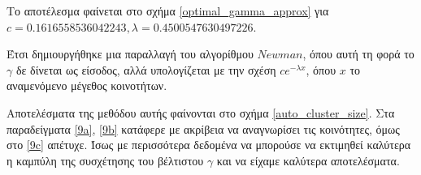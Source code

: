 \documentclass[12pt, letterpaper]{article}
\begin{document}
Το αποτέλεσμα φαίνεται στο σχήμα \ref{optimal_gamma_approx} για $c = 0.1616558536042243, \lambda = 0.4500547630497226$.

Έτσι δημιουργήθηκε μια παραλλαγή του αλγορίθμου $Newman$, όπου αυτή τη φορά 
το $\gamma$ δε δίνεται ως είσοδος, αλλά υπολογίζεται με την σχέση $ce^{-\lambda x}$,
όπου $x$ το αναμενόμενο μέγεθος κοινοτήτων.

Αποτελέσματα της μεθόδου αυτής φαίνονται στο σχήμα \ref{auto_cluster_size}.
Στα παραδείγματα \ref{9a}, \ref{9b} κατάφερε με ακρίβεια να αναγνωρίσει 
τις κοινότητες, όμως στο \ref{9c} απέτυχε. Ίσως με περισσότερα δεδομένα 
να μπορούσε να εκτιμηθεί καλύτερα η καμπύλη της συσχέτησης του βέλτιστου $\gamma$
και να είχαμε καλύτερα αποτελέσματα. 
\end{document}
